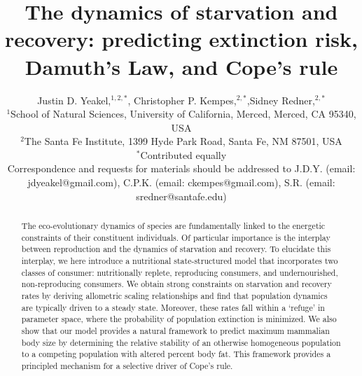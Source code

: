\documentclass[twocolumn,preprintnumbers,amsmath,amssymb,superscriptaddress]{revtex4}
\begin{document}
\author{Justin D. Yeakel,${}^{1,2,*}$, Christopher P. Kempes,${}^{2,*}$,Sidney Redner,${}^{2,*}$\\
${}^{1}$School of Natural Sciences, University of California, Merced, Merced, CA 95340, USA\\
${}^{2}$The Santa Fe Institute, 1399 Hyde Park Road, Santa Fe, NM 87501, USA\\
${}^*$Contributed equally\\
Correspondence and requests for materials should be addressed to J.D.Y. (email: jdyeakel@gmail.com), C.P.K. (email: ckempes@gmail.com), S.R. (email: sredner@santafe.edu)
} 


\title{The dynamics of starvation and recovery: predicting extinction risk, Damuth's Law, and Cope's rule}%


\begin{abstract} %
The eco-evolutionary dynamics of species are fundamentally linked to the energetic constraints of their constituent individuals. Of particular importance is the interplay between reproduction and the dynamics of starvation and recovery. To elucidate this interplay, we here introduce a nutritional state-structured model that incorporates two classes of consumer: nutritionally replete, reproducing consumers, and undernourished, non-reproducing consumers. We obtain strong constraints on starvation and recovery rates by deriving allometric scaling relationships and find that population dynamics are typically driven to a steady state. Moreover, these rates fall within a `refuge' in parameter space, where the probability of population extinction is minimized. We also show that our model provides a natural framework to predict maximum mammalian body size by determining the relative stability of an otherwise homogeneous population to a competing population with altered percent body fat. This framework provides a principled mechanism for a selective driver of Cope's rule.
\end{abstract}
\end{document}
